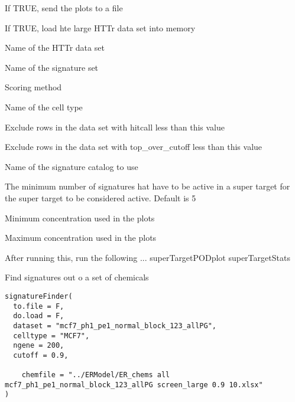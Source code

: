 \documentclass[letterpaper]{book}
\begin{document}
\begin{Arguments}
\begin{ldescription}
\item[\code{to.file}] If TRUE, send the plots to a file

\item[\code{do.load}] If TRUE, load hte large HTTr data set into memory

\item[\code{dataset}] Name of the HTTr data set

\item[\code{sigset}] Name of the signature set

\item[\code{method}] Scoring method

\item[\code{celltype}] Name of the cell type

\item[\code{hccut}] Exclude rows in the data set with hitcall less than this value

\item[\code{tccut}] Exclude rows in the data set with top\_over\_cutoff less than this value

\item[\code{sigcatalog}] Name of the signature catalog to use

\item[\code{cutoff}] The minimum number of signatures hat have to be active in a super
target for the super target to be considered active. Default is 5

\item[\code{minconc}] Minimum concentration used in the plots

\item[\code{maxconc}] Maximum concentration used in the plots

After running this, run the following ...
superTargetPODplot
superTargetStats
\end{ldescription}
\end{Arguments}
%
\begin{Description}\relax
Find signatures out o a set of chemicals
\end{Description}
%
\begin{Usage}
\begin{verbatim}
signatureFinder(
  to.file = F,
  do.load = F,
  dataset = "mcf7_ph1_pe1_normal_block_123_allPG",
  celltype = "MCF7",
  ngene = 200,
  cutoff = 0.9,
 
    chemfile = "../ERModel/ER_chems all mcf7_ph1_pe1_normal_block_123_allPG screen_large 0.9 10.xlsx"
)
\end{verbatim}
\end{Usage}
\end{document}
